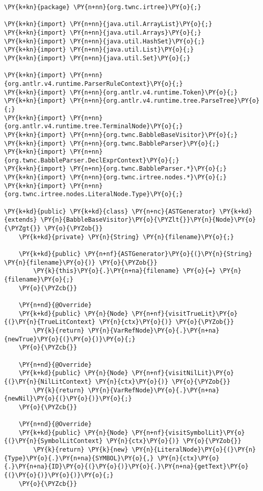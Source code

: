 \begin{Verbatim}[commandchars=\\\{\}]
\PY{k+kn}{package} \PY{n+nn}{org.twnc.irtree}\PY{o}{;}

\PY{k+kn}{import} \PY{n+nn}{java.util.ArrayList}\PY{o}{;}
\PY{k+kn}{import} \PY{n+nn}{java.util.Arrays}\PY{o}{;}
\PY{k+kn}{import} \PY{n+nn}{java.util.HashSet}\PY{o}{;}
\PY{k+kn}{import} \PY{n+nn}{java.util.List}\PY{o}{;}
\PY{k+kn}{import} \PY{n+nn}{java.util.Set}\PY{o}{;}

\PY{k+kn}{import} \PY{n+nn}{org.antlr.v4.runtime.ParserRuleContext}\PY{o}{;}
\PY{k+kn}{import} \PY{n+nn}{org.antlr.v4.runtime.Token}\PY{o}{;}
\PY{k+kn}{import} \PY{n+nn}{org.antlr.v4.runtime.tree.ParseTree}\PY{o}{;}
\PY{k+kn}{import} \PY{n+nn}{org.antlr.v4.runtime.tree.TerminalNode}\PY{o}{;}
\PY{k+kn}{import} \PY{n+nn}{org.twnc.BabbleBaseVisitor}\PY{o}{;}
\PY{k+kn}{import} \PY{n+nn}{org.twnc.BabbleParser}\PY{o}{;}
\PY{k+kn}{import} \PY{n+nn}{org.twnc.BabbleParser.DeclExprContext}\PY{o}{;}
\PY{k+kn}{import} \PY{n+nn}{org.twnc.BabbleParser.*}\PY{o}{;}
\PY{k+kn}{import} \PY{n+nn}{org.twnc.irtree.nodes.*}\PY{o}{;}
\PY{k+kn}{import} \PY{n+nn}{org.twnc.irtree.nodes.LiteralNode.Type}\PY{o}{;}

\PY{k+kd}{public} \PY{k+kd}{class} \PY{n+nc}{ASTGenerator} \PY{k+kd}{extends} \PY{n}{BabbleBaseVisitor}\PY{o}{\PYZlt{}}\PY{n}{Node}\PY{o}{\PYZgt{}} \PY{o}{\PYZob{}}
    \PY{k+kd}{private} \PY{n}{String} \PY{n}{filename}\PY{o}{;}
    
    \PY{k+kd}{public} \PY{n+nf}{ASTGenerator}\PY{o}{(}\PY{n}{String} \PY{n}{filename}\PY{o}{)} \PY{o}{\PYZob{}}
        \PY{k}{this}\PY{o}{.}\PY{n+na}{filename} \PY{o}{=} \PY{n}{filename}\PY{o}{;}
    \PY{o}{\PYZcb{}}
    
    \PY{n+nd}{@Override}
    \PY{k+kd}{public} \PY{n}{Node} \PY{n+nf}{visitTrueLit}\PY{o}{(}\PY{n}{TrueLitContext} \PY{n}{ctx}\PY{o}{)} \PY{o}{\PYZob{}}
        \PY{k}{return} \PY{n}{VarRefNode}\PY{o}{.}\PY{n+na}{newTrue}\PY{o}{(}\PY{o}{)}\PY{o}{;}
    \PY{o}{\PYZcb{}}

    \PY{n+nd}{@Override}
    \PY{k+kd}{public} \PY{n}{Node} \PY{n+nf}{visitNilLit}\PY{o}{(}\PY{n}{NilLitContext} \PY{n}{ctx}\PY{o}{)} \PY{o}{\PYZob{}}
        \PY{k}{return} \PY{n}{VarRefNode}\PY{o}{.}\PY{n+na}{newNil}\PY{o}{(}\PY{o}{)}\PY{o}{;}
    \PY{o}{\PYZcb{}}

    \PY{n+nd}{@Override}
    \PY{k+kd}{public} \PY{n}{Node} \PY{n+nf}{visitSymbolLit}\PY{o}{(}\PY{n}{SymbolLitContext} \PY{n}{ctx}\PY{o}{)} \PY{o}{\PYZob{}}
        \PY{k}{return} \PY{k}{new} \PY{n}{LiteralNode}\PY{o}{(}\PY{n}{Type}\PY{o}{.}\PY{n+na}{SYMBOL}\PY{o}{,} \PY{n}{ctx}\PY{o}{.}\PY{n+na}{ID}\PY{o}{(}\PY{o}{)}\PY{o}{.}\PY{n+na}{getText}\PY{o}{(}\PY{o}{)}\PY{o}{)}\PY{o}{;}
    \PY{o}{\PYZcb{}}


\end{Verbatim}

